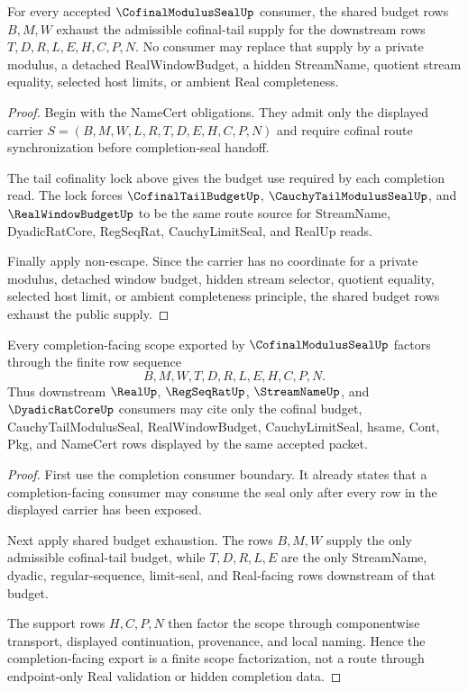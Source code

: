 \begin{theorem}
\label{thm:cofinal-modulus-seal-shared-budget-exhaustion}
For every accepted $\CofinalModulusSealUp$ consumer, the shared budget rows $B,M,W$ exhaust the admissible cofinal-tail supply for the downstream rows $T,D,R,L,E,H,C,P,N$. No consumer may replace that supply by a private modulus, a detached RealWindowBudget, a hidden StreamName, quotient stream equality, selected host limits, or ambient Real completeness.
\end{theorem}
\begin{proof}
Begin with the NameCert obligations. They admit only the displayed carrier $S=(B,M,W,L,R,T,D,E,H,C,P,N)$ and require cofinal route synchronization before completion-seal handoff.

The tail cofinality lock above gives the budget use required by each completion read. The lock forces $\CofinalTailBudgetUp$, $\CauchyTailModulusSealUp$, and $\RealWindowBudgetUp$ to be the same route source for StreamName, DyadicRatCore, RegSeqRat, CauchyLimitSeal, and RealUp reads.

Finally apply non-escape. Since the carrier has no coordinate for a private modulus, detached window budget, hidden stream selector, quotient equality, selected host limit, or ambient completeness principle, the shared budget rows exhaust the public supply.
\end{proof}

\begin{theorem}
\label{thm:cofinal-modulus-seal-completion-scope-factorization}
Every completion-facing scope exported by $\CofinalModulusSealUp$ factors through the finite row sequence
$$
B,M,W,T,D,R,L,E,H,C,P,N.
$$
Thus downstream $\RealUp$, $\RegSeqRatUp$, $\StreamNameUp$, and $\DyadicRatCoreUp$ consumers may cite only the cofinal budget, CauchyTailModulusSeal, RealWindowBudget, CauchyLimitSeal, hsame, Cont, Pkg, and NameCert rows displayed by the same accepted packet.
\end{theorem}
\begin{proof}
First use the completion consumer boundary. It already states that a completion-facing consumer may consume the seal only after every row in the displayed carrier has been exposed.

Next apply shared budget exhaustion. The rows $B,M,W$ supply the only admissible cofinal-tail budget, while $T,D,R,L,E$ are the only StreamName, dyadic, regular-sequence, limit-seal, and Real-facing rows downstream of that budget.

The support rows $H,C,P,N$ then factor the scope through componentwise transport, displayed continuation, provenance, and local naming. Hence the completion-facing export is a finite scope factorization, not a route through endpoint-only Real validation or hidden completion data.
\end{proof}

